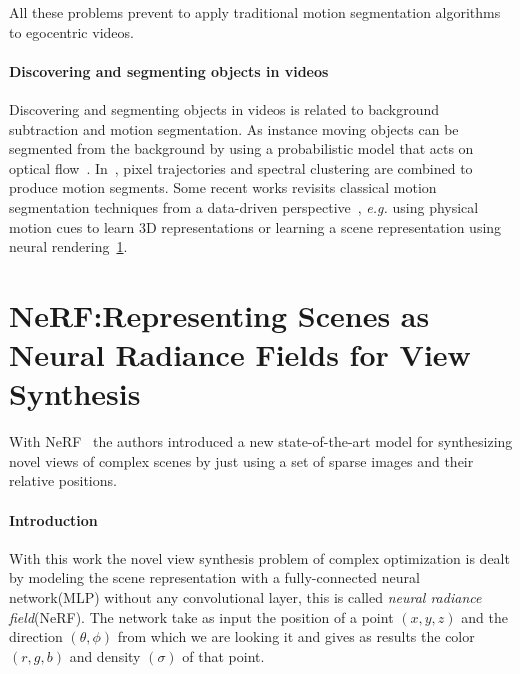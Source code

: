 All these problems prevent to apply traditional motion segmentation algorithms to egocentric videos.

\paragraph{Discovering and segmenting objects in videos}
Discovering and segmenting objects in videos is related to background subtraction and 
motion segmentation.
As instance moving objects can be segmented from the background by using a probabilistic model
that acts on optical flow~\cite{ndiff_1}. In~\cite{ndiff_3}, pixel trajectories and
spectral clustering are combined to produce motion segments. Some recent works revisits classical motion segmentation
techniques from a data-driven perspective~\cite{ndiff_38}, \textit{e.g.} using 
physical motion cues to learn 3D representations or learning a scene representation
using neural rendering~\ref{sec:nerf}. 



\section{NeRF:Representing Scenes as Neural Radiance Fields for View Synthesis}\label{sec:nerf}
With NeRF~\cite{nerf} the authors introduced a new state-of-the-art model
for synthesizing novel views of complex scenes by just using a set of sparse
images and their relative positions.

\paragraph*{Introduction}With this work the novel view synthesis problem of complex optimization
 is dealt  
by modeling the scene representation with a fully-connected neural network(MLP) without any
convolutional layer, this is called \textit{neural radiance field}(NeRF). The network
take as input the position of a point $(x,y,z)$ and the direction $(\theta,\phi)$ from which we are looking it
and gives as results the color$(r,g,b)$ and density $(\sigma)$ of that point. 

